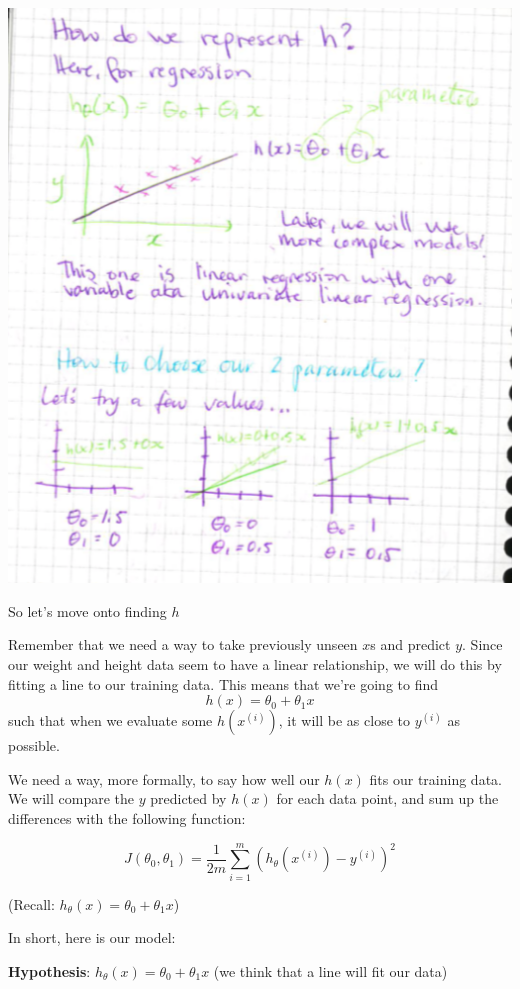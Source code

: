 \documentclass[12pt]{article}
\begin{document}
\includegraphics[width={\textwidth}]{regression-model}

So let's move onto finding $h$

Remember that we need a way to take previously unseen $x$s and predict $y$. Since our weight and height data seem to have a linear relationship, we will do this by fitting a line to our training data. This means that we're going to find \[h(x) = \theta_0 + \theta_1x\] such that when we evaluate some $h(x^{(i)})$, it will be as close to $y^{(i)}$ as possible. 

We need a way, more formally, to say how well our $h(x)$ fits our training data. We will compare the $y$ predicted by $h(x)$ for each data point, and sum up the differences with the following function:

\[J(\theta_0, \theta_1) = \frac{1}{2m} \sum^m_{i=1}(h_\theta(x^{(i)}) - y^{(i)})^2\]

(Recall: $h_\theta(x) = \theta_0 + \theta_1x$)

In short, here is our model:

\textbf{Hypothesis}: $h_\theta(x) = \theta_0 + \theta_1x$ (we think that a line will fit our data)
\end{document}
